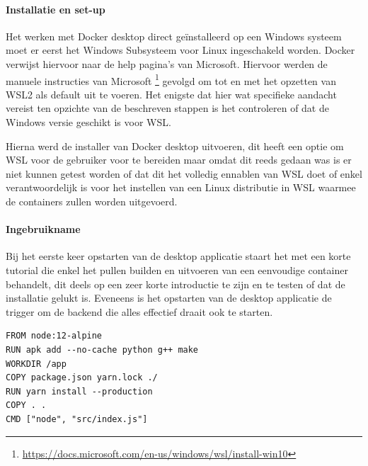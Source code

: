 \paragraph{Installatie en set-up}
Het werken met Docker desktop direct geïnstalleerd op een Windows systeem moet er eerst het Windows Subsysteem voor Linux ingeschakeld worden. Docker verwijst hiervoor naar de help pagina’s van Microsoft. Hiervoor werden de manuele instructies van Microsoft \footnote{\url{https://docs.microsoft.com/en-us/windows/wsl/install-win10}} gevolgd om tot en met het opzetten van WSL2 als default uit te voeren. Het enigste dat hier wat specifieke aandacht vereist ten opzichte van de beschreven stappen is het controleren of dat de Windows versie geschikt is voor WSL.

Hierna werd de installer van Docker desktop uitvoeren, dit heeft een optie om WSL voor de gebruiker voor te bereiden maar omdat dit reeds gedaan was is er niet kunnen getest worden of dat dit het volledig ennablen van WSL doet of enkel verantwoordelijk is voor het instellen van een Linux distributie in WSL waarmee de containers zullen worden uitgevoerd.

\paragraph{Ingebruikname}
Bij het eerste keer opstarten van de desktop applicatie staart het met een korte tutorial die enkel het pullen builden en uitvoeren van een eenvoudige container behandelt, dit deels op een zeer korte introductie te zijn en te testen of dat de installatie gelukt is. Eveneens is het opstarten van de desktop applicatie de trigger om de backend die alles effectief draait ook te starten.

\begin{lstlisting}[caption=inhoud van de Dockerfile,label=lst:Dockerfile]
FROM node:12-alpine
RUN apk add --no-cache python g++ make
WORKDIR /app
COPY package.json yarn.lock ./
RUN yarn install --production
COPY . .
CMD ["node", "src/index.js"]
\end{lstlisting}

